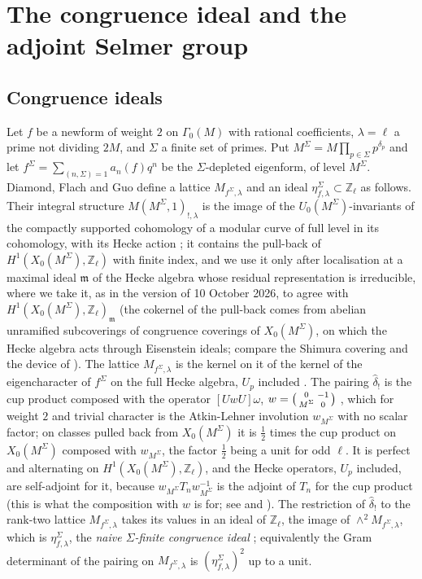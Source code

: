 \documentclass[11pt]{amsart}
\theoremstyle{definition}
\newcommand{\Z}{\mathbb{Z}}
\begin{document}
\section{The congruence ideal and the adjoint Selmer group}\label{sec:quant}

\subsection{Congruence ideals}\label{sec:dfg}
Let $f$ be a newform of weight $2$ on $\Gamma_0(M)$ with rational coefficients, $\lambda=\ell$ a prime not dividing $2M$, and $\Sigma$ a finite set of primes. Put $M^\Sigma=M\prod_{p\in\Sigma}p^{\delta_p}$ and let $f^\Sigma=\sum_{(n,\Sigma)=1}a_n(f)q^n$ be the $\Sigma$-depleted eigenform, of level $M^\Sigma$. Diamond, Flach and Guo define \cite[\S\S1.5.3, 1.6.2, 1.7.3]{DFG04} a lattice $M_{f^\Sigma,\lambda}$ and an ideal $\eta^\Sigma_{f,\lambda}\subset\Z_\ell$ as follows. Their integral structure $M(M^\Sigma,1)_{!,\lambda}$ is the image of the $U_0(M^\Sigma)$-invariants of the compactly supported cohomology of a modular curve of full level in its cohomology, with its Hecke action \cite[\S\S1.2, 1.4]{DFG04}; it contains the pull-back of $H^1(X_0(M^\Sigma),\Z_\ell)$ with finite index, and we use it only after localisation at a maximal ideal $\mathfrak m$ of the Hecke algebra whose residual representation is irreducible, where we take it, as in the version of 10 October 2026, to agree with $H^1(X_0(M^\Sigma),\Z_\ell)_{\mathfrak m}$ (the cokernel of the pull-back comes from abelian unramified subcoverings of congruence coverings of $X_0(M^\Sigma)$, on which the Hecke algebra acts through Eisenstein ideals; compare the Shimura covering \cite{LingOesterle,Ribet88} and the device of \cite[Lemma 1.8, Corollary 1.9]{DFG04}). The lattice $M_{f^\Sigma,\lambda}$ is the kernel on it of the kernel of the eigencharacter of $f^\Sigma$ on the full Hecke algebra, $U_p$ included \cite[\S\S1.1.2, 1.6.2]{DFG04}. The pairing $\hat\delta_!$ is the cup product composed with the operator $[UwU]\omega$, $w=\begin{psmallmatrix}0&-1\\M^\Sigma&0\end{psmallmatrix}$ \cite[(13), (14)]{DFG04}, which for weight $2$ and trivial character is the Atkin-Lehner involution $w_{M^\Sigma}$ with no scalar factor; on classes pulled back from $X_0(M^\Sigma)$ it is $\frac12$ times the cup product on $X_0(M^\Sigma)$ composed with $w_{M^\Sigma}$, the factor $\frac12$ being a unit for odd $\ell$. It is perfect and alternating on $H^1(X_0(M^\Sigma),\Z_\ell)$, and the Hecke operators, $U_p$ included, are self-adjoint for it, because $w_{M^\Sigma}T_nw_{M^\Sigma}^{-1}$ is the adjoint of $T_n$ for the cup product (this is what the composition with $w$ is for; see \cite[\S\S1.6.1, 1.8.2]{DFG04} and \cite[\S4.4]{DDT}). The restriction of $\hat\delta_!$ to the rank-two lattice $M_{f^\Sigma,\lambda}$ takes its values in an ideal of $\Z_\ell$, the image of $\wedge^2M_{f^\Sigma,\lambda}$, which is $\eta^\Sigma_{f,\lambda}$, the \emph{naive $\Sigma$-finite congruence ideal} \cite[\S1.7.3]{DFG04}; equivalently the Gram determinant of the pairing on $M_{f^\Sigma,\lambda}$ is $(\eta^\Sigma_{f,\lambda})^2$ up to a unit.
\end{document}
